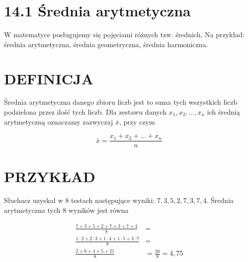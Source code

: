 \documentclass[10pt]{article}
\begin{document}
\section*{14.1 Średnia arytmetyczna}
W matematyce posługujemy się pojęciami różnych tzw. średnich. Na przykład: średnia arytmetyczna, średnia geometryczna, średnia harmoniczna.

\section*{DEFINICJA}
Średnia arytmetyczna danego zbioru liczb jest to suma tych wszystkich liczb podzielona przez ilość tych liczb. Dla zestawu danych \(x_{1}, x_{2}, \ldots, x_{n}\) ich średnią arytmetyczną oznaczamy zazwyczaj \(\bar{x}\), przy czym

\[
\bar{x}=\frac{x_{1}+x_{2}+\ldots+x_{n}}{n}
\]

\section*{PRZYKŁAD}
Słuchacz uzyskał w 8 testach następujące wyniki: \(7,3,5,2,7,3,7,4\). Średnia arytmetyczna tych 8 wyników jest równa

\[
\begin{aligned}
\frac{7+3+5+2+7+3+7+4}{8} & = \\
\frac{1 \cdot 2+2 \cdot 3+1 \cdot 4+1 \cdot 5+3 \cdot 7}{8} & = \\
\frac{2+6+4+5+21}{8} & =\frac{38}{8}=4,75
\end{aligned}
\]
\end{document}
